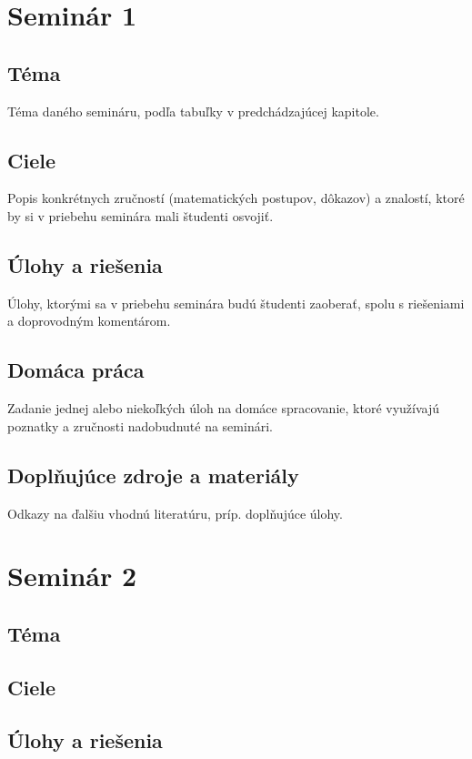 \documentclass[11pt,a4paper,oneside,final]{book}
\begin{document}
\section*{Seminár 1}

\subsection*{Téma}
Téma daného semináru, podľa tabuľky v predchádzajúcej kapitole.

\subsection*{Ciele}
Popis konkrétnych zručností (matematických postupov, dôkazov) a znalostí, ktoré by si v priebehu seminára mali študenti osvojiť.

\subsection*{Úlohy a riešenia}
Úlohy, ktorými sa v priebehu seminára budú študenti zaoberať, spolu s riešeniami a doprovodným komentárom.

\subsection*{Domáca práca}
Zadanie jednej alebo niekoľkých úloh na domáce spracovanie, ktoré využívajú poznatky a zruč\-nosti nadobudnuté na seminári.

\subsection*{Doplňujúce zdroje a materiály}
Odkazy na ďalšiu vhodnú literatúru, príp. doplňujúce úlohy.

\newpage
\section*{Seminár 2}
\subsection*{Téma}

\subsection*{Ciele}

\subsection*{Úlohy a riešenia}
\end{document}
